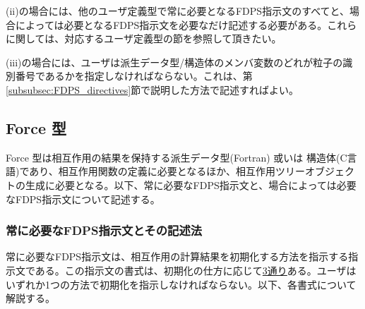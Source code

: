 (ii)の場合には、他のユーザ定義型で常に必要となるFDPS指示文のすべてと、場合によっては必要となるFDPS指示文を必要なだけ記述する必要がある。これらに関しては、対応するユーザ定義型の節を参照して頂きたい。

(iii)の場合には、ユーザは派生データ型/構造体のメンバ変数のどれが粒子の識別番号であるかを指定しなければならない。これは、第\ref{subsubsec:FDPS_directives}節で説明した方法で記述すればよい。

\subsection{Force 型}
\label{subsec:Force}
Force 型は相互作用の結果を保持する派生データ型(Fortran) 或いは 構造体(C言語)であり、相互作用関数の定義に必要となるほか、相互作用ツリーオブジェクトの生成に必要となる。以下、常に必要なFDPS指示文と、場合によっては必要なFDPS指示文について記述する。

\subsubsection{常に必要なFDPS指示文とその記述法}
常に必要なFDPS指示文は、相互作用の計算結果を初期化する方法を指示する指示文である。この指示文の書式は、初期化の仕方に応じて\uline{3通り}ある。ユーザはいずれか1つの方法で初期化を指示しなければならない。以下、各書式について解説する。

